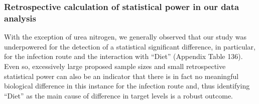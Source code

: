 \documentclass[
  12pt,
  letterpaper,
]{article}
\begin{document}
\subsubsection{Retrospective calculation of statistical power in our data analysis}\label{retrospective-calculation-of-statistical-power-in-our-data-analysis-2}

With the exception of urea nitrogen, we generally observed that our study was underpowered for the detection of a statistical significant difference, in particular, for the infection route and the interaction with ``Diet'' (Appendix Table 136). Even so, excessively large proposed sample sizes and small retrospective statistical power can also be an indicator that there is in fact no meaningful biological difference in this instance for the infection route and, thus identifying ``Diet'' as the main cause of difference in target levels is a robust outcome.
\end{document}
